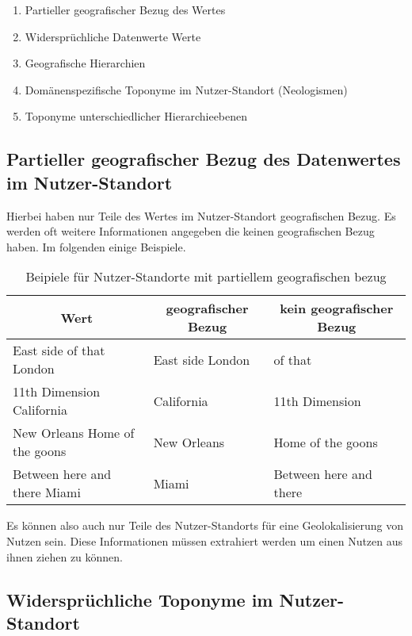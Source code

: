 			\begin{enumerate}	
			 	\item Partieller geografischer Bezug des Wertes
			 	\item Widersprüchliche Datenwerte Werte
			 	\item Geografische Hierarchien
			 	\item Domänenspezifische Toponyme im Nutzer-Standort (Neologismen)
			 	\item Toponyme unterschiedlicher Hierarchieebenen
			 \end{enumerate}	 

		\subsection{Partieller geografischer Bezug des Datenwertes im Nutzer-Standort} \label{subsub:partiellerGeografischerBezug} 

			Hierbei haben nur Teile des Wertes im Nutzer-Standort geografischen Bezug. 
			Es werden oft weitere Informationen angegeben die keinen geografischen Bezug haben. 
			Im folgenden einige Beispiele.

			\begin{table}[h]
				\centering
				\caption{Beipiele für Nutzer-Standorte mit partiellem geografischen bezug}
				\label{my-label}
				\begin{tabular}{|l|l|l|}
				\hline
				\multicolumn{1}{|c|}{Wert} & \multicolumn{1}{c|}{geografischer Bezug} & \multicolumn{1}{c|}{kein geografischer Bezug} \\ \hline
				East side of that London & East side London & of that \\ \hline
				11th Dimension California & California & 11th Dimension \\ \hline
				New Orleans Home of the goons & New Orleans & Home of the goons \\ \hline
				Between here and there Miami & Miami & Between here and there \\ \hline
				\end{tabular}
			\end{table}
			
			Es können also auch nur Teile des Nutzer-Standorts für eine Geolokalisierung von Nutzen sein.
			Diese Informationen müssen extrahiert werden um einen Nutzen aus ihnen ziehen zu können. 

		\subsection{Widersprüchliche Toponyme im Nutzer-Standort} \label{subsub:wiederspruechlicheBezuege} 

